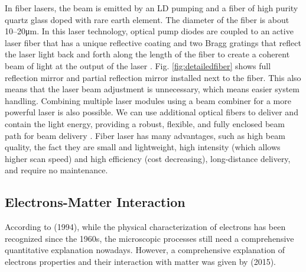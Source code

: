 In fiber lasers, the beam is emitted by an LD pumping and a fiber of high purity  quartz glass doped with  rare earth element. The diameter of the fiber is about \numrange[range-phrase=--]{10}{20}\unit{\micro\metre}. In this laser technology, optical pump diodes are coupled to an active laser fiber that has a unique reflective coating and two Bragg gratings that reflect the laser light back and forth along the length of the fiber to create a coherent beam of light at the output of the laser \cite{milewski_additive_2017}. Fig. \ref{fig:detailedfiber} shows full reflection mirror and partial reflection mirror installed next to the fiber. This also means that the laser beam adjustment is unnecessary, which means easier system handling. Combining multiple laser modules using a beam combiner for a more powerful laser is also possible. We can use additional optical fibers to deliver and contain the light energy, providing a robust, flexible, and fully enclosed beam path for beam delivery \cite{milewski_additive_2017}. Fiber laser has many advantages, such as high beam quality, the fact they are small and lightweight, high intensity (which allows higher scan speed) and high efficiency (cost decreasing), long-distance delivery, and require no maintenance. 
\subsection{Electrons-Matter Interaction}
\label{subsec:ebminter}
According to \citeauthor{schultz_h_electron_1994} (1994), while the physical characterization of electrons has been recognized since the 1960s, the microscopic processes still need a comprehensive quantitative explanation nowadays. However, a comprehensive explanation of electrons properties and their interaction with matter was given by \citeauthor{krumeich_properties_2015} (2015).
